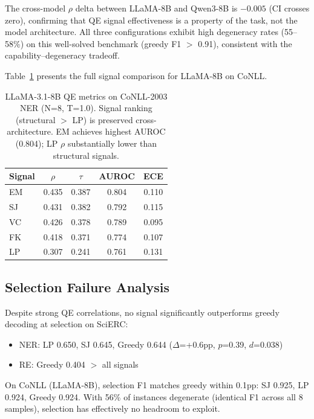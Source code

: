\documentclass[11pt,a4paper]{article}
\begin{document}
The cross-model $\rho$ delta between LLaMA-8B and Qwen3-8B is $-0.005$ (CI crosses zero), confirming that QE signal effectiveness is a property of the task, not the model architecture. All three configurations exhibit high degeneracy rates (55--58\%) on this well-solved benchmark (greedy F1 $>$ 0.91), consistent with the capability--degeneracy tradeoff.

Table~\ref{tab:llama_qe} presents the full signal comparison for LLaMA-8B on CoNLL.

\begin{table}[t]
\centering
\small
\begin{tabular}{lcccc}
\toprule
Signal & $\rho$ & $\tau$ & AUROC & ECE \\
\midrule
EM & 0.435 & 0.387 & 0.804 & 0.110 \\
SJ & 0.431 & 0.382 & 0.792 & 0.115 \\
VC & 0.426 & 0.378 & 0.789 & 0.095 \\
FK & 0.418 & 0.371 & 0.774 & 0.107 \\
LP & 0.307 & 0.241 & 0.761 & 0.131 \\
\bottomrule
\end{tabular}
\caption{LLaMA-3.1-8B QE metrics on CoNLL-2003 NER (N=8, T=1.0). Signal ranking (structural $>$ LP) is preserved cross-architecture. EM achieves highest AUROC (0.804); LP $\rho$ substantially lower than structural signals.}
\label{tab:llama_qe}
\end{table}

\subsection{Selection Failure Analysis}

Despite strong QE correlations, no signal significantly outperforms greedy decoding at selection on SciERC:
\begin{itemize}
    \item NER: LP 0.650, SJ 0.645, Greedy 0.644 ($\Delta$=+0.6pp, $p$=0.39, $d$=0.038)
    \item RE: Greedy 0.404 $>$ all signals
\end{itemize}

On CoNLL (LLaMA-8B), selection F1 matches greedy within 0.1pp: SJ 0.925, LP 0.924, Greedy 0.924. With 56\% of instances degenerate (identical F1 across all 8 samples), selection has effectively no headroom to exploit.
\end{document}
